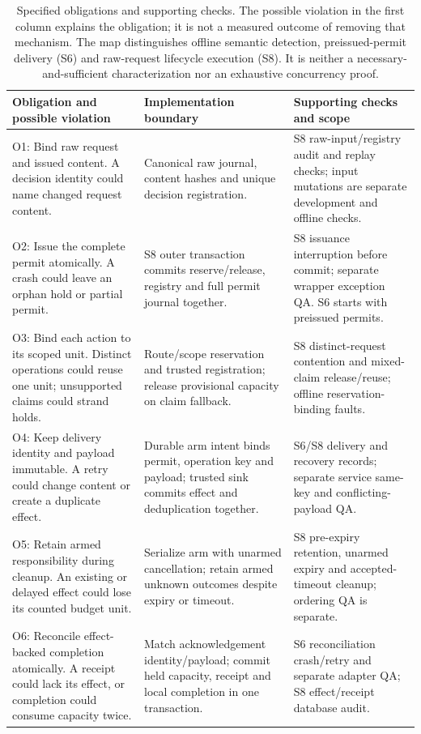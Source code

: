 \begin{table}[!htbp]
\centering
\small
\setlength{\tabcolsep}{4pt}
\renewcommand{\arraystretch}{1.10}
\caption{Specified obligations and supporting checks. The possible violation in the first column explains the obligation; it is not a measured outcome of removing that mechanism. The map distinguishes offline semantic detection, preissued-permit delivery (S6) and raw-request lifecycle execution (S8). It is neither a necessary-and-sufficient characterization nor an exhaustive concurrency proof.}
\label{tab:obligations}
\begin{tabularx}{\linewidth}{@{}>{\raggedright\arraybackslash}X>{\raggedright\arraybackslash}X>{\raggedright\arraybackslash}X@{}}
\toprule
Obligation and possible violation & Implementation boundary & Supporting checks and scope\\
\midrule
O1: Bind raw request and issued content. A decision identity could name changed request content. & Canonical raw journal, content hashes and unique decision registration. & S8 raw-input/registry audit and replay checks; input mutations are separate development and offline checks. \\\addlinespace[3pt]
O2: Issue the complete permit atomically. A crash could leave an orphan hold or partial permit. & S8 outer transaction commits reserve/release, registry and full permit journal together. & S8 issuance interruption before commit; separate wrapper exception QA. S6 starts with preissued permits. \\\addlinespace[3pt]
O3: Bind each action to its scoped unit. Distinct operations could reuse one unit; unsupported claims could strand holds. & Route/scope reservation and trusted registration; release provisional capacity on claim fallback. & S8 distinct-request contention and mixed-claim release/reuse; offline reservation-binding faults. \\\addlinespace[3pt]
O4: Keep delivery identity and payload immutable. A retry could change content or create a duplicate effect. & Durable arm intent binds permit, operation key and payload; trusted sink commits effect and deduplication together. & S6/S8 delivery and recovery records; separate service same-key and conflicting-payload QA. \\\addlinespace[3pt]
O5: Retain armed responsibility during cleanup. An existing or delayed effect could lose its counted budget unit. & Serialize arm with unarmed cancellation; retain armed unknown outcomes despite expiry or timeout. & S8 pre-expiry retention, unarmed expiry and accepted-timeout cleanup; ordering QA is separate. \\\addlinespace[3pt]
O6: Reconcile effect-backed completion atomically. A receipt could lack its effect, or completion could consume capacity twice. & Match acknowledgement identity/payload; commit held capacity, receipt and local completion in one transaction. & S6 reconciliation crash/retry and separate adapter QA; S8 effect/receipt database audit. \\
\bottomrule
\end{tabularx}
\end{table}
